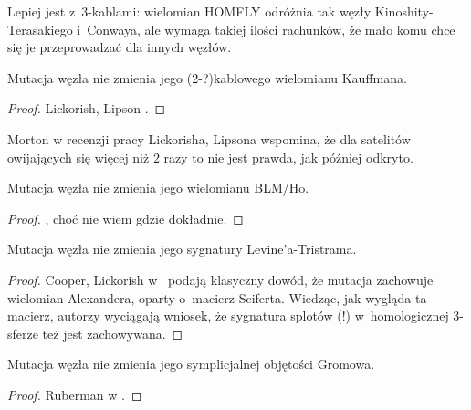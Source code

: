 Lepiej jest z~3-kablami: wielomian HOMFLY odróżnia tak węzły Kinoshity-Terasakiego i~Conwaya, ale wymaga takiej ilości rachunków, że mało komu chce się je przeprowadzać dla innych węzłów.
%
%

\begin{proposition}
    Mutacja węzła nie zmienia jego (2-?)kablowego wielomianu Kauffmana.
%
%
\end{proposition}

\begin{proof}
%
%
    Lickorish, Lipson \cite{lipson87}.
\end{proof}

Morton w recenzji pracy Lickorisha, Lipsona wspomina, że dla satelitów owijających się więcej niż $2$ razy to nie jest prawda, jak później odkryto.

\begin{proposition}
%
    Mutacja węzła nie zmienia jego wielomianu BLM/Ho.
\end{proposition}

\begin{proof}
    \cite{tanaka09}, choć nie wiem gdzie dokładnie.
\end{proof}

\begin{proposition}
%
    Mutacja węzła nie zmienia jego sygnatury Levine'a-Tristrama.
\end{proposition}

\begin{proof}
%
%
    Cooper, Lickorish w~\cite{cooper99} podają klasyczny dowód, że mutacja zachowuje wielomian Alexandera, oparty o~macierz Seiferta.
    Wiedząc, jak wygląda ta macierz, autorzy wyciągają wniosek, że sygnatura splotów (!) w~homologicznej 3-sferze też jest zachowywana.
\end{proof}

\begin{proposition}
%
\label{mutants_the_same_volume}%
    Mutacja węzła nie zmienia jego symplicjalnej objętości Gromowa.
\end{proposition}

\begin{proof}
%
    Ruberman w \cite{ruberman87}.
\end{proof}

